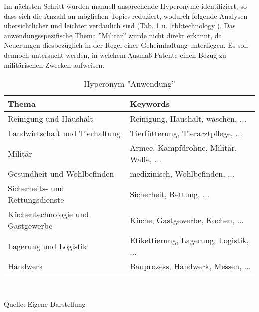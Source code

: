 Im nächsten Schritt wurden manuell ansprechende Hyperonyme identifiziert, so dass sich die Anzahl an möglichen Topics reduziert, wodurch folgende Analysen übersichtlicher und leichter verdaulich sind (Tab. \ref{tbl:anwendung} u. \ref{tbl:technology}). Das anwendungsspezifische Thema ''Militär'' wurde nicht direkt erkannt, da Neuerungen diesbezüglich in der Regel einer Geheimhaltung unterliegen. Es soll dennoch untersucht werden, in welchem Ausmaß Patente einen Bezug zu militärischen Zwecken aufweisen.
\begin{table}[H]
	\caption{Hyperonym ''Anwendung''}
	\label{tbl:anwendung}
	\begin{tabularx}{\textwidth}{X|X}
		\hline
		\textbf{Thema} & \textbf{Keywords} \\
		\hline
		Reinigung und Haushalt & Reinigung, Haushalt, waschen, ... \\
		\hline
		Landwirtschaft und Tierhaltung & Tierfütterung, Tierarztpflege, ... \\
		\hline
		Militär & Armee, Kampfdrohne, Militär, Waffe, ... \\
		\hline
		Gesundheit und Wohlbefinden & medizinisch, Wohlbefinden, ... \\
		\hline
		Sicherheits- und Rettungsdienste & Sicherheit, Rettung, ... \\
		\hline
		Küchentechnologie und Gastgewerbe & Küche, Gastgewerbe, Kochen, ... \\
		\hline
		Lagerung und Logistik & Etikettierung, Lagerung, Logistik, ... \\
		\hline
		Handwerk & Bauprozess, Handwerk, Messen, ... \\
		\hline
	\end{tabularx} \\
	\vspace{0.5em}
	\raggedright
	\normalsize{Quelle: Eigene Darstellung}
	\vspace{-1.0em}
\end{table}

